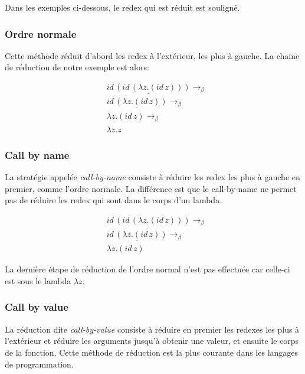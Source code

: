 Dans les exemples ci-dessous, le redex qui est réduit est souligné.

\subsubsection*{Ordre normale}

Cette méthode réduit d'abord les redex à l'extérieur, les plus à gauche.
La chaine de réduction de notre exemple est alors:

\begin{align*}
  & \underline{id \, (id \, (\lambda z . (id \, z)))} \rightarrow_{\beta}\\
  & \underline{id \, (\lambda z . (id \, z))} \rightarrow_{\beta} \\
  & \lambda z . \underline{(id \, z)} \rightarrow_{\beta} \\
  & \lambda z . z
\end{align*}

\subsubsection*{Call by name}

La stratégie appelée \textit{call-by-name} consiste à réduire les redex les plus
à gauche en premier, comme l'ordre normale. La différence est que le
call-by-name ne permet pas de réduire les redex qui sont dans le corps d'un lambda.

\begin{align*}
  & \underline{id \, (id \, (\lambda z . (id \, z)))} \rightarrow_{\beta}\\
  & \underline{id \, (\lambda z . (id \, z))} \rightarrow_{\beta} \\
  & \lambda z . (id \, z)
\end{align*}

La dernière étape de réduction de l'ordre normal n'est pas effectuée car celle-ci est
sous le lambda $\lambda z$.

\subsubsection*{Call by value}

La réduction dite \textit{call-by-value} consiste à réduire en premier les
redexes les plus à l'extérieur et réduire les arguments jusqu'à obtenir une valeur, et ensuite le corps de la fonction.
Cette méthode de réduction est la plus courante dans les langages de
programmation.

